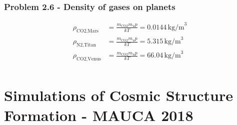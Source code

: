 \documentclass[10pt,a4paper]{book}
\theoremstyle{definition}
\begin{document}
\subsection{Problem 2.6 - Density of gases on planets}
\begin{align}
\rho_\text{CO2,Mars}&=\frac{m_\text{CO2}m_u p}{kT}=0.0144\,\text{kg/m}^3\\
\rho_\text{N2,Titan}&=\frac{m_\text{CO2}m_u p}{kT}=5.315\,\text{kg/m}^3\\
\rho_\text{CO2,Venus}&=\frac{m_\text{CO2}m_u p}{kT}=66.04\,\text{kg/m}^3\\
\end{align}


\newpage
\chapter{Simulations of Cosmic Structure Formation - MAUCA 2018}
\end{document}
